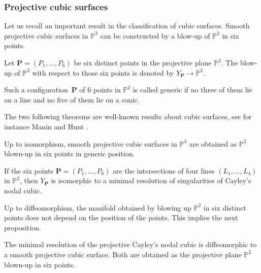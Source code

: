 \subsubsection{Projective cubic surfaces}

Let us recall an important result in the classification of cubic surfaces. Smooth projective cubic surfaces in $\mathbb{P}^3$ can be constructed by a blow-up of $\mathbb{P}^2$ in six points.

Let $\boldsymbol{P}=(P_1,\dots,P_6)$ be six distinct points in the projective plane $\mathbb{P}^2$. The blow-up of $\mathbb{P}^2$ with respect to those six points is denoted by $Y_{\boldsymbol{P}}\to \mathbb{P}^2$.

\begin{definition}
Such a configuration~$\boldsymbol{P}$ of $6$ points in $\mathbb{P}^2$ is called generic if no three of them lie on a line and no five of them lie on a conic.
\end{definition}
The two following theorems are well-known results about cubic surfaces, see for instance Manin \cite{Manin1986} and Hunt \cite{Hunt}.
\begin{theorem}\label{th_cubic_six}
Up to isomorphism, smooth projective cubic surfaces in $\mathbb{P}^3$ are obtained as $\mathbb{P}^2$ blown-up in six points in generic position.
\end{theorem}
\begin{theorem}\label{th_cayley_six}
If the six points $\boldsymbol{P}=(P_1,\dots,P_6)$ are the intersections of four lines $(L_1,\dots,L_4)$ in $\mathbb{P}^2$, then $Y_{\boldsymbol{P}}$ is isomorphic to a minimal resolution of singularities of Cayley's nodal cubic.
\end{theorem}

Up to diffeomorphism, the manifold obtained by blowing up $\mathbb{P}^2$ in six distinct points does not depend on the position of the points. This implies the next proposition.

\begin{proposition}
The minimal resolution of the projective Cayley's nodal cubic is diffeomorphic to a smooth projective cubic surface. Both are obtained as the projective plane $\mathbb{P}^2$ blown-up in six points.
\end{proposition}

